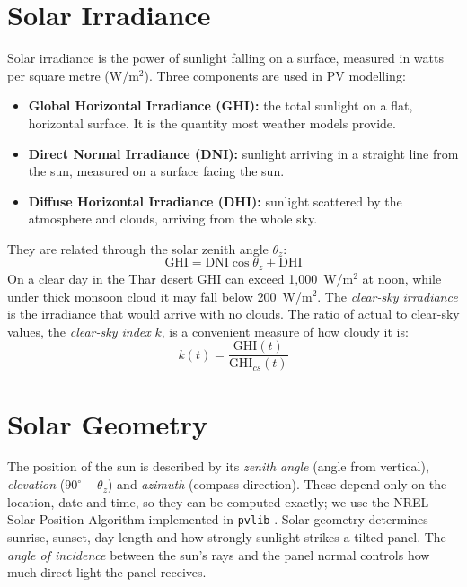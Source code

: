 \documentclass[12pt]{report}
\begin{document}
\section{Solar Irradiance}
\vspace{1mm}
Solar irradiance is the power of sunlight falling on a surface, measured in watts per square metre (W/m$^2$). Three components are used in PV modelling:
\begin{itemize}[noitemsep]
    \item \textbf{Global Horizontal Irradiance (GHI):} the total sunlight on a flat, horizontal surface. It is the quantity most weather models provide.
    \item \textbf{Direct Normal Irradiance (DNI):} sunlight arriving in a straight line from the sun, measured on a surface facing the sun.
    \item \textbf{Diffuse Horizontal Irradiance (DHI):} sunlight scattered by the atmosphere and clouds, arriving from the whole sky.
\end{itemize}
They are related through the solar zenith angle $\theta_z$:
\begin{equation}
    \text{GHI} = \text{DNI}\cos\theta_z + \text{DHI}
\end{equation}
On a clear day in the Thar desert GHI can exceed 1,000~W/m$^2$ at noon, while under thick monsoon cloud it may fall below 200~W/m$^2$. The \textit{clear-sky irradiance} is the irradiance that would arrive with no clouds. The ratio of actual to clear-sky values, the \textit{clear-sky index} $k$, is a convenient measure of how cloudy it is:
\begin{equation}
    k(t) = \frac{\text{GHI}(t)}{\text{GHI}_{cs}(t)}
\end{equation}

\section{Solar Geometry}
\vspace{1mm}
The position of the sun is described by its \textit{zenith angle} (angle from vertical), \textit{elevation} ($90^\circ - \theta_z$) and \textit{azimuth} (compass direction). These depend only on the location, date and time, so they can be computed exactly; we use the NREL Solar Position Algorithm implemented in \texttt{pvlib} \cite{pvlib}. Solar geometry determines sunrise, sunset, day length and how strongly sunlight strikes a tilted panel. The \textit{angle of incidence} between the sun's rays and the panel normal controls how much direct light the panel receives.
\end{document}
